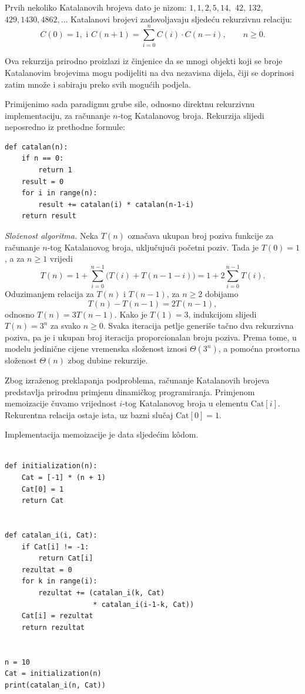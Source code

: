 Prvih nekoliko Katalanovih brojeva dato je nizom: $
1, 1, 2, 5, 14,$ 42, 132, $429, 1430, 4862,\ldots$ Katalanovi brojevi zadovoljavaju sljedeću rekurzivnu relaciju: 
$$
C(0)=1, \text{ i } 
C(n+1)=\sum_{i=0}^{n} C(i)\cdot C(n-i),
\qquad n\geq 0.$$

Ova rekurzija prirodno proizlazi iz činjenice da se mnogi objekti koji se broje Katalanovim brojevima mogu podijeliti na dva nezavisna dijela, čiji se doprinosi zatim množe i sabiraju preko svih mogućih podjela.

\medskip

Primijenimo sada paradigmu grube sile, odnosno direktnu rekurzivnu implementaciju, za računanje $n$-tog Katalanovog broja. Rekurzija slijedi neposredno iz prethodne formule:

\begin{verbatim}
def catalan(n):
    if n == 0:
        return 1
    result = 0
    for i in range(n):
        result += catalan(i) * catalan(n-1-i)
    return result
\end{verbatim}

\textit{Složenost algoritma.} Neka $T(n)$ označava ukupan broj poziva funkcije za računanje $n$-tog Katalanovog broja, uključujući početni poziv. Tada je $T(0)=1$, a za $n\geq 1$ vrijedi
\[
T(n)=1+\sum_{i=0}^{n-1}\bigl(T(i)+T(n-1-i)\bigr)
=1+2\sum_{i=0}^{n-1}T(i).
\]
Oduzimanjem relacija za $T(n)$ i $T(n-1)$, za $n\geq 2$ dobijamo
\[
T(n)-T(n-1)=2T(n-1),
\]
odnosno $T(n)=3T(n-1)$. Kako je $T(1)=3$, indukcijom slijedi $T(n)=3^n$ za svako $n\geq 0$. Svaka iteracija petlje generiše tačno dva rekurzivna poziva, pa je i ukupan broj iteracija proporcionalan broju poziva. Prema tome, u modelu jedinične cijene vremenska složenost iznosi $\Theta(3^n)$, a pomoćna prostorna složenost $\Theta(n)$ zbog dubine rekurzije.

Zbog izraženog preklapanja podproblema, računanje Katalanovih brojeva predstavlja prirodnu primjenu dinamičkog programiranja. Primjenom memoizacije čuvamo vrijednost $i$-tog Katalanovog broja u elementu $\textrm{Cat}[i]$. Rekurentna relacija ostaje ista, uz bazni slučaj $\textrm{Cat}[0]=1$.

Implementacija memoizacije je data sljedećim k\^odom.

  \begin{verbatim}
	
def initialization(n):
    Cat = [-1] * (n + 1)
    Cat[0] = 1
    return Cat


def catalan_i(i, Cat):
    if Cat[i] != -1:
        return Cat[i]
    rezultat = 0
    for k in range(i):
        rezultat += (catalan_i(k, Cat)
                     * catalan_i(i-1-k, Cat))
    Cat[i] = rezultat
    return rezultat


n = 10
Cat = initialization(n)
print(catalan_i(n, Cat))
\end{verbatim}  

